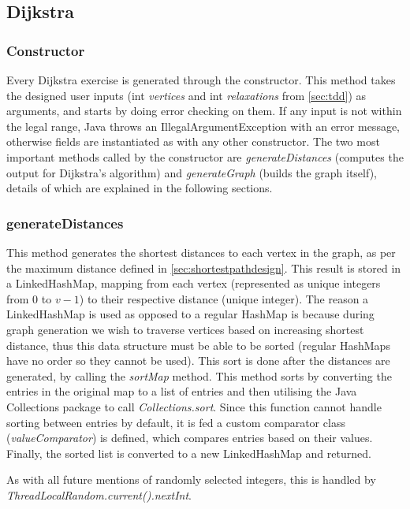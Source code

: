 \documentclass{l4proj}
\begin{document}
\subsection{Dijkstra}

\subsubsection{Constructor}

Every Dijkstra exercise is generated through the constructor. This method takes the designed user inputs (int \emph{vertices} and int \emph{relaxations} from \autoref{sec:tdd}) as arguments, and  starts by doing error checking on them. If any input is not within the legal range, Java throws an IllegalArgumentException with an error message, otherwise fields are instantiated as with any other constructor. The two most important methods called by the constructor are \emph{generateDistances} (computes the output for Dijkstra's algorithm) and \emph{generateGraph} (builds the graph itself), details of which are explained in the following sections.

\subsubsection{generateDistances}

This method generates the shortest distances to each vertex in the graph, as per the maximum distance defined in \autoref{sec:shortestpathdesign}. This result is stored in a LinkedHashMap, mapping from each vertex (represented as unique integers from $0$ to $v-1$) to their respective distance (unique integer). The reason a LinkedHashMap is used as opposed to a regular HashMap is because during graph generation we wish to traverse vertices based on increasing shortest distance, thus this data structure must be able to be sorted (regular HashMaps have no order so they cannot be used). This sort is done after the distances are generated, by calling the \emph{sortMap} method. This method sorts by converting the entries in the original map to a list of entries and then utilising the Java Collections package to call \emph{Collections.sort}. Since this function cannot handle sorting between entries by default, it is fed a custom comparator class (\emph{valueComparator}) is defined, which compares entries based on their values. Finally, the sorted list is converted to a new LinkedHashMap and returned.

As with all future mentions of randomly selected integers, this is handled by \emph{ThreadLocalRandom.current().nextInt}.
\end{document}
